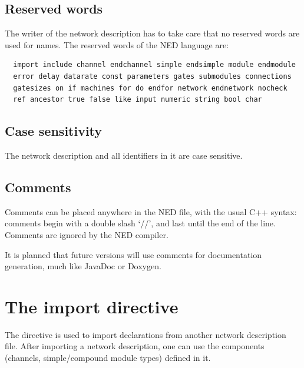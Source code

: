\subsection{Reserved words}


The writer of the network description has to take care that no
reserved words are used for names. The reserved words of the
NED language are:
\begin{verbatim}
  import include channel endchannel simple endsimple module endmodule
  error delay datarate const parameters gates submodules connections
  gatesizes on if machines for do endfor network endnetwork nocheck
  ref ancestor true false like input numeric string bool char
\end{verbatim}




\subsection{Case sensitivity}


The network description and all identifiers in it are case sensitive.


\subsection{Comments}


Comments can be placed anywhere in the NED file, with the usual C++
syntax: comments begin with a double slash `//', and last until
the end of the line. Comments are ignored by the NED compiler.

It is planned that future {\opp} versions will use comments
for documentation generation, much like JavaDoc or Doxygen.


\section{The import directive}


The  directive
is used to import declarations from another network description file.
After importing a network description, one can use the components
(channels, simple/compound module types) defined in it.

